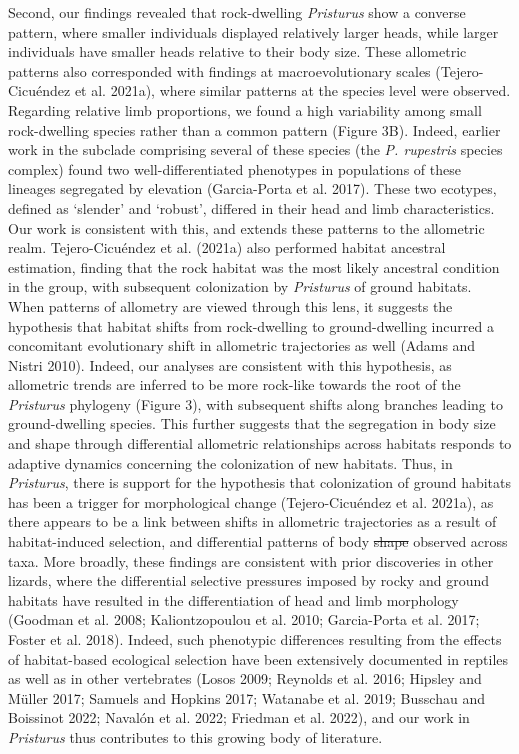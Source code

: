\documentclass[
  11pt,
]{article}
\providecommand{\DIFaddtex}[1]{{\protect\color{blue}\uwave{#1}}} %
\providecommand{\DIFdeltex}[1]{{\protect\color{red}\sout{#1}}}                      %
\providecommand{\DIFaddbegin}{} %
\providecommand{\DIFaddend}{} %
\providecommand{\DIFdelbegin}{} %
\providecommand{\DIFdelend}{} %
\providecommand{\DIFadd}[1]{\texorpdfstring{\DIFaddtex{#1}}{#1}} %
\providecommand{\DIFdel}[1]{\texorpdfstring{\DIFdeltex{#1}}{}} %
\newcommand{\DIFscaledelfig}{0.5}
\newlength{\DIFdelgraphicswidth} %
\newlength{\DIFdelgraphicsheight} %
\newcommand{\DIFaddincludegraphics}[2][]{{\color{blue}\fbox{\DIFOincludegraphics[#1]{#2}}}} %
\newcommand{\DIFdelincludegraphics}[2][]{%
\sbox{\DIFdelgraphicsbox}{\DIFOincludegraphics[#1]{#2}}%
\settoboxwidth{\DIFdelgraphicswidth}{\DIFdelgraphicsbox} %
\settoboxtotalheight{\DIFdelgraphicsheight}{\DIFdelgraphicsbox} %
\scalebox{\DIFscaledelfig}{%
\parbox[b]{\DIFdelgraphicswidth}{\usebox{\DIFdelgraphicsbox}\\[-\baselineskip] \rule{\DIFdelgraphicswidth}{0em}}\llap{\resizebox{\DIFdelgraphicswidth}{\DIFdelgraphicsheight}{%
\setlength{\unitlength}{\DIFdelgraphicswidth}%
\begin{picture}(1,1)%
\thicklines\linethickness{2pt} %
{\color[rgb]{1,0,0}\put(0,0){\framebox(1,1){}}}%
{\color[rgb]{1,0,0}\put(0,0){\line( 1,1){1}}}%
{\color[rgb]{1,0,0}\put(0,1){\line(1,-1){1}}}%
\end{picture}%
}\hspace*{3pt}}} %
} %
\DeclareRobustCommand{\DIFaddbegin}{\DIFOaddbegin \let\includegraphics\DIFaddincludegraphics} %
\DeclareRobustCommand{\DIFaddend}{\DIFOaddend \let\includegraphics\DIFOincludegraphics} %
\DeclareRobustCommand{\DIFdelbegin}{\DIFOdelbegin \let\includegraphics\DIFdelincludegraphics} %
\DeclareRobustCommand{\DIFdelend}{\DIFOaddend \let\includegraphics\DIFOincludegraphics} %
\begin{document}
Second, our findings revealed that rock-dwelling \emph{Pristurus} show a
converse pattern, where smaller individuals displayed relatively larger
heads, while larger individuals have smaller heads relative to their
body size. These allometric patterns also corresponded with findings at
macroevolutionary scales (Tejero-Cicuéndez et al. 2021a), where similar
patterns at the species level were observed. Regarding relative limb
proportions, we found a high variability among small rock-dwelling
species rather than a common pattern (Figure 3B). Indeed, earlier work
in the subclade comprising several of these species (the \emph{P.
rupestris} species complex) found two well-differentiated phenotypes in
populations of these lineages segregated by elevation (Garcia-Porta et
al. 2017). These two ecotypes, defined as `slender' and `robust',
differed in their head and limb characteristics. Our work is consistent
with this, and extends these patterns to the allometric realm.
Tejero-Cicuéndez et al. (2021a) also performed habitat ancestral
estimation, finding that the rock habitat was the most likely ancestral
condition in the group, with subsequent colonization by \emph{Pristurus}
of ground habitats. When patterns of allometry are viewed through this
lens, it suggests the hypothesis that habitat shifts from rock-dwelling
to ground-dwelling incurred a concomitant evolutionary shift in
allometric trajectories as well (Adams and Nistri 2010). Indeed, our
analyses are consistent with this hypothesis, as allometric trends are
inferred to be more rock-like towards the root of the \emph{Pristurus}
phylogeny (Figure 3), with subsequent shifts along branches leading to
ground-dwelling species. This further suggests that the segregation in
body size and shape through differential allometric relationships across
habitats responds to adaptive dynamics concerning the colonization of
new habitats. Thus, in \emph{Pristurus}, there is support for the
hypothesis that colonization of ground habitats has been a trigger for
morphological change (Tejero-Cicuéndez et al. 2021a), as there appears
to be a link between shifts in allometric trajectories as a result of
habitat-induced selection, and differential patterns of body \DIFdelbegin \DIFdel{shape
}\DIFdelend \DIFaddbegin \DIFadd{form
}\DIFaddend observed across taxa. More broadly, these findings are consistent with
prior discoveries in other lizards, where the differential selective
pressures imposed by rocky and ground habitats have resulted in the
differentiation of head and limb morphology (Goodman et al. 2008;
Kaliontzopoulou et al. 2010; Garcia-Porta et al. 2017; Foster et al.
2018). Indeed, such phenotypic differences resulting from the effects of
habitat-based ecological selection have been extensively documented in
reptiles as well as in other vertebrates (Losos 2009; Reynolds et al.
2016; Hipsley and Müller 2017; Samuels and Hopkins 2017; Watanabe et al.
2019; Busschau and Boissinot 2022; Navalón et al. 2022; Friedman et al.
2022), and our work in \emph{Pristurus} thus contributes to this growing
body of literature. \hfill\break
\end{document}
